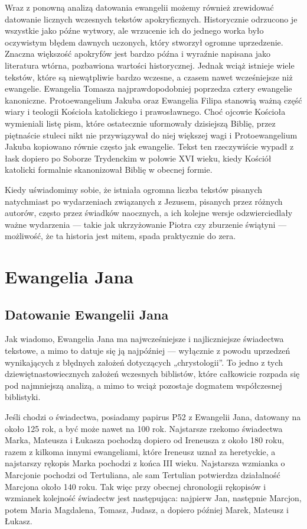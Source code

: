 Wraz z ponowną analizą datowania ewangelii możemy również zrewidować datowanie licznych wczesnych tekstów apokryficznych.
Historycznie odrzucono je wszystkie jako późne wytwory, ale wrzucenie ich do jednego worka było oczywistym błędem dawnych uczonych, który stworzył ogromne uprzedzenie.
Znaczna większość apokryfów jest bardzo późna i wyraźnie napisana jako literatura wtórna, pozbawiona wartości historycznej.
Jednak wciąż istnieje wiele tekstów, które są niewątpliwie bardzo wczesne, a czasem nawet wcześniejsze niż ewangelie.
Ewangelia Tomasza najprawdopodobniej poprzedza cztery ewangelie kanoniczne.
Protoewangelium Jakuba oraz Ewangelia Filipa stanowią ważną część wiary i teologii Kościoła katolickiego i prawosławnego.
Choć ojcowie Kościoła wymieniali listę pism, które ostatecznie uformowały dzisiejszą Biblię, przez piętnaście stuleci nikt nie przywiązywał do niej większej wagi i Protoewangelium Jakuba kopiowano równie często jak ewangelie.
Tekst ten rzeczywiście wypadł z łask dopiero po Soborze Trydenckim w połowie XVI wieku, kiedy Kościół katolicki formalnie skanonizował Biblię w obecnej formie.

Kiedy uświadomimy sobie, że istniała ogromna liczba tekstów pisanych natychmiast po wydarzeniach związanych z Jezusem, pisanych przez różnych autorów, często przez świadków naocznych, a ich kolejne wersje odzwierciedlały ważne wydarzenia — takie jak ukrzyżowanie Piotra czy zburzenie świątyni — możliwość, że ta historia jest mitem, spada praktycznie do zera.

\section{Ewangelia Jana}\label{sec:john-gospel}

\subsection{Datowanie Ewangelii Jana}\label{subsec:dating-of-the-gospel-of-john}

Jak wiadomo, Ewangelia Jana ma najwcześniejsze i najliczniejsze świadectwa tekstowe, a mimo to datuje się ją najpóźniej — wyłącznie z powodu uprzedzeń wynikających z błędnych założeń dotyczących „chrystologii”.
To jedno z tych dziewiętnastowiecznych założeń wczesnych biblistów, które całkowicie rozpada się pod najmniejszą analizą, a mimo to wciąż pozostaje dogmatem współczesnej biblistyki.

Jeśli chodzi o świadectwa, posiadamy papirus P52 z Ewangelii Jana, datowany na około 125 rok, a być może nawet na 100 rok.
Najstarsze rzekomo świadectwa Marka, Mateusza i Łukasza pochodzą dopiero od Ireneusza z około 180 roku, razem z kilkoma innymi ewangeliami, które Ireneusz uznał za heretyckie, a najstarszy rękopis Marka pochodzi z końca III wieku.
Najstarsza wzmianka o Marcjonie pochodzi od Tertuliana, ale sam Tertulian potwierdza działalność Marcjona około 140 roku.
Tak więc przy obecnej chronologii rękopisów i wzmianek kolejność świadectw jest następująca: najpierw Jan, następnie Marcjon, potem Maria Magdalena, Tomasz, Judasz, a dopiero później Marek, Mateusz i Łukasz.

